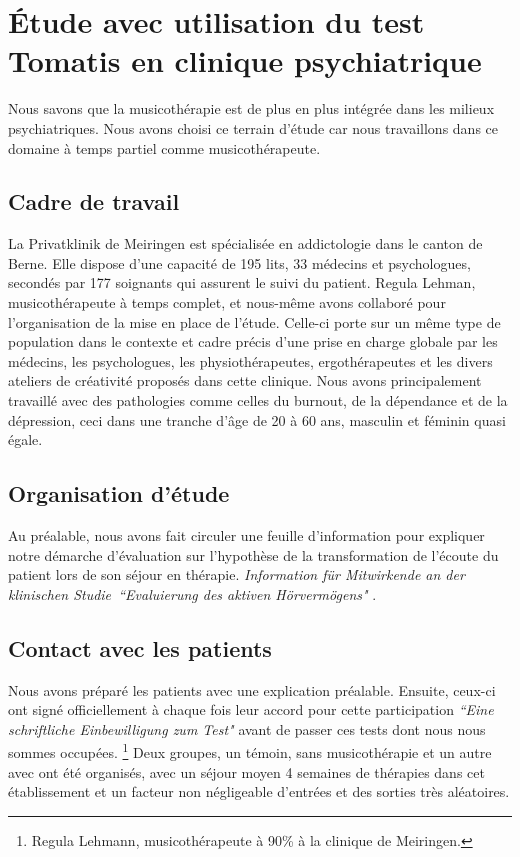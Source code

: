 \chapter[\'Etude en clinique]{\'Etude avec utilisation du test Tomatis en clinique psychiatrique}

Nous savons que la musicothérapie est de plus en plus intégrée dans
les milieux psychiatriques. Nous avons choisi ce terrain d'étude car 
nous  travaillons dans ce domaine  à temps partiel comme musicothérapeute.

\section{Cadre de travail}
 La Privatklinik
de Meiringen est  spécialisée en
addictologie dans le canton de Berne. Elle dispose d'une capacité de 195 lits, 33 médecins et
psychologues, secondés par 177 soignants qui assurent le suivi du
patient. Regula Lehman, musicothérapeute à temps complet, et nous-même avons
collaboré  pour l'organisation de la mise en place de l'étude. Celle-ci porte sur un même type de
population dans le contexte et cadre  précis d'une prise en charge globale
par les médecins, les psychologues, les physiothérapeutes,
ergothérapeutes et les divers ateliers de créativité proposés dans
cette clinique. Nous avons principalement travaillé avec des
pathologies comme celles du burnout, de la dépendance et de la
dépression, ceci dans une tranche d'âge de 20 à 60 ans, masculin et
féminin quasi égale. 

\section{Organisation d'étude}
Au préalable, nous avons fait circuler une
feuille d'information pour expliquer notre démarche d'évaluation sur
l'hypothèse de la transformation de l'écoute du patient lors de son
séjour en thérapie. \emph{Information für Mitwirkende an der klinischen
Studie\  ``Evaluierung des aktiven Hörvermögens" }. 
 
 \section{Contact avec les patients}
 
 Nous avons
préparé les patients avec une explication préalable. Ensuite,
ceux-ci ont signé officiellement à chaque fois leur
accord pour cette participation  \emph{``Eine schriftliche Einbewilligung zum
Test"} avant de passer ces tests dont nous nous sommes occupées.
  \footnote{Regula
  Lehmann, musicothérapeute  à 90\%  à la clinique de Meiringen.} Deux groupes, un témoin, sans
musicothérapie et un autre avec ont été organisés, avec un séjour moyen 4 semaines de thérapies dans cet établissement et un facteur non négligeable d'entrées et des sorties très aléatoires.


